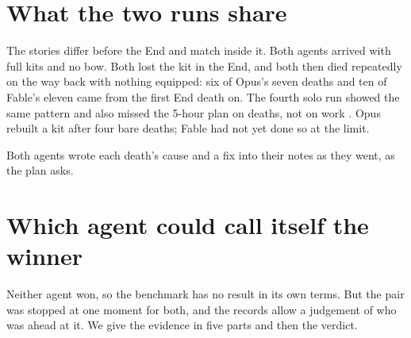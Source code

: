 \documentclass[11pt,a4paper]{article}
\begin{document}
\section{What the two runs share}
\label{sec:shared}

The stories differ before the End and match inside it. Both agents arrived with full kits and no bow. Both lost the kit in the End, and both then died repeatedly on the way back with nothing equipped: six of Opus's seven deaths and ten of Fable's eleven came from the first End death on. The fourth solo run showed the same pattern and also missed the 5-hour plan on deaths, not on work \citep{batsuk2026fourth}. Opus rebuilt a kit after four bare deaths; Fable had not yet done so at the limit.

Both agents wrote each death's cause and a fix into their notes as they went, as the plan asks.

\section{Which agent could call itself the winner}
\label{sec:winner}

Neither agent won, so the benchmark has no result in its own terms. But the pair was stopped at one moment for both, and the records allow a judgement of who was ahead at it. We give the evidence in five parts and then the verdict.
\end{document}
